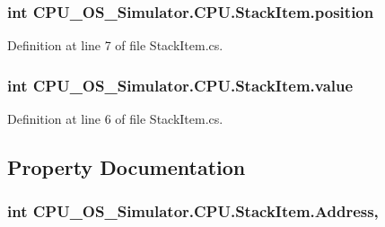 \subsubsection[{position}]{\setlength{\rightskip}{0pt plus 5cm}int C\+P\+U\+\_\+\+O\+S\+\_\+\+Simulator.\+C\+P\+U.\+Stack\+Item.\+position\hspace{0.3cm}{\ttfamily [private]}}\label{class_c_p_u___o_s___simulator_1_1_c_p_u_1_1_stack_item_abc7ce976cd8474fc072eb155c4f155ac}


Definition at line 7 of file Stack\+Item.\+cs.

\hypertarget{class_c_p_u___o_s___simulator_1_1_c_p_u_1_1_stack_item_a114a8ae5aae9b8c45e2e0c36ce856cd2}{}
\subsubsection[{value}]{\setlength{\rightskip}{0pt plus 5cm}int C\+P\+U\+\_\+\+O\+S\+\_\+\+Simulator.\+C\+P\+U.\+Stack\+Item.\+value\hspace{0.3cm}{\ttfamily [private]}}\label{class_c_p_u___o_s___simulator_1_1_c_p_u_1_1_stack_item_a114a8ae5aae9b8c45e2e0c36ce856cd2}


Definition at line 6 of file Stack\+Item.\+cs.



\subsection{Property Documentation}
\hypertarget{class_c_p_u___o_s___simulator_1_1_c_p_u_1_1_stack_item_a44f4c5bd346e25e81c54b01012768bc5}{}
\subsubsection[{Address}]{\setlength{\rightskip}{0pt plus 5cm}int C\+P\+U\+\_\+\+O\+S\+\_\+\+Simulator.\+C\+P\+U.\+Stack\+Item.\+Address\hspace{0.3cm}{\ttfamily [get]}, {\ttfamily [set]}}\label{class_c_p_u___o_s___simulator_1_1_c_p_u_1_1_stack_item_a44f4c5bd346e25e81c54b01012768bc5}


